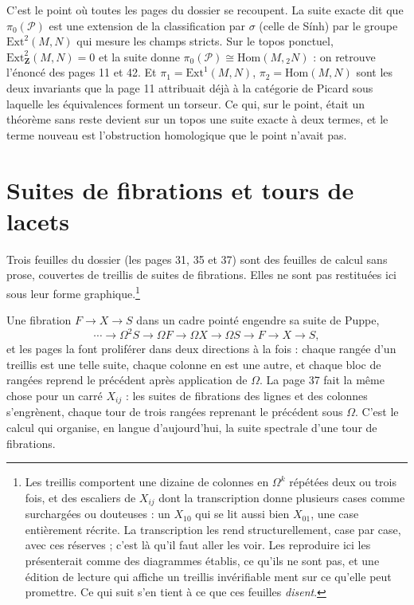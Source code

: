 \documentclass[11pt,a4paper]{article}
\begin{document}
C'est le point où toutes les pages du dossier se recoupent. La suite exacte
dit que $\pi_{0}(\mathcal{P})$ est une extension de la classification par
$\sigma$ (celle de Sính) par le groupe $\mathrm{Ext}^{2}(M,N)$ qui mesure
les champs stricts. Sur le topos ponctuel, $\mathrm{Ext}^{2}_{\mathbf{Z}}(M,N)
= 0$ et la suite donne $\pi_{0}(\mathcal{P}) \cong \mathrm{Hom}(M, {}_{2}N)$ :
on retrouve l'énoncé des pages 11 et 42. Et $\pi_{1} =
\mathrm{Ext}^{1}(M,N)$, $\pi_{2} = \mathrm{Hom}(M,N)$ sont les deux invariants
que la page 11 attribuait déjà à la catégorie de Picard sous laquelle les
équivalences forment un torseur. Ce qui, sur le point, était un théorème sans
reste devient sur un topos une suite exacte à deux termes, et le terme
nouveau est l'obstruction homologique que le point n'avait pas.

\section*{Suites de fibrations et tours de lacets}

Trois feuilles du dossier (les pages 31, 35 et 37) sont des feuilles de
calcul sans prose, couvertes de treillis de suites de fibrations. Elles ne
sont pas restituées ici sous leur forme graphique.\footnote{Les treillis comportent une dizaine de
colonnes en $\Omega^{k}$ répétées deux ou trois fois, et des escaliers de
$X_{ij}$ dont la transcription donne plusieurs cases comme surchargées ou
douteuses : un $X_{10}$ qui se lit aussi bien $X_{01}$, une case entièrement
récrite. La transcription les rend structurellement, case par case, avec ces
réserves ; c'est là qu'il faut aller les voir. Les reproduire ici les
présenterait comme des diagrammes établis, ce qu'ils ne sont pas, et une
édition de lecture qui affiche un treillis invérifiable ment sur ce qu'elle
peut promettre. Ce qui suit s'en tient à ce que ces
feuilles \emph{disent}.}

Une fibration $F \to X \to S$ dans un cadre
pointé engendre sa suite de Puppe,
\[
\cdots \to \Omega^{2}S \to \Omega F \to \Omega X \to \Omega S \to F \to X
\to S,
\]
et les pages la font proliférer dans deux directions à la fois : chaque rangée
d'un treillis est une telle suite, chaque colonne en est une autre, et chaque
bloc de rangées reprend le précédent après application de $\Omega$. La page 37
fait la même chose pour un carré $X_{ij}$ : les suites de fibrations des
lignes et des colonnes s'engrènent, chaque tour de trois rangées reprenant le
précédent sous $\Omega$. C'est le calcul qui organise, en langue
d'aujourd'hui, la suite spectrale d'une tour de fibrations.
\end{document}
